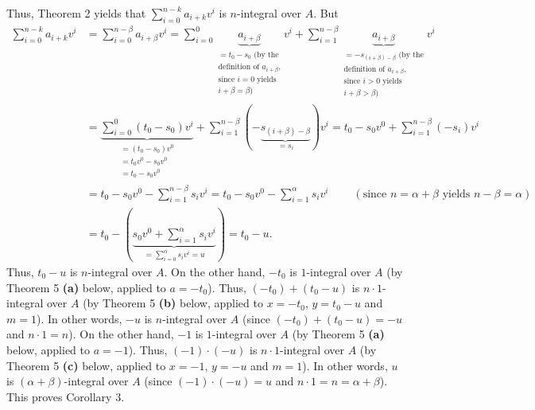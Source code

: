 \documentclass[12pt,final,notitlepage,onecolumn]{article}%
\begin{document}
Thus, Theorem 2 yields that $\sum\limits_{i=0}^{n-k}a_{i+k}v^{i}$ is
$n$-integral over $A$. But%
\begin{align*}
\sum\limits_{i=0}^{n-k}a_{i+k}v^{i}  &  =\sum\limits_{i=0}^{n-\beta}%
a_{i+\beta}v^{i}=\sum\limits_{i=0}^{0}\underbrace{a_{i+\beta}}%
_{\substack{=t_{0}-s_{0}\text{ (by the}\\\text{definition of }a_{i+\beta
}\text{,}\\\text{since }i=0\text{ yields}\\i+\beta=\beta\text{)}}}v^{i}%
+\sum\limits_{i=1}^{n-\beta}\underbrace{a_{i+\beta}}_{\substack{=-s_{\left(
i+\beta\right)  -\beta}\text{ (by the}\\\text{definition of }a_{i+\beta
}\text{,}\\\text{since }i>0\text{ yields}\\i+\beta>\beta\text{)}}}v^{i}\\
&  =\underbrace{\sum\limits_{i=0}^{0}\left(  t_{0}-s_{0}\right)  v^{i}%
}_{\substack{=\left(  t_{0}-s_{0}\right)  v^{0}\\=t_{0}v^{0}-s_{0}%
v^{0}\\=t_{0}-s_{0}v^{0}}}+\sum\limits_{i=1}^{n-\beta}\left(
-\underbrace{s_{\left(  i+\beta\right)  -\beta}}_{=s_{i}}\right)  v^{i}%
=t_{0}-s_{0}v^{0}+\sum\limits_{i=1}^{n-\beta}\left(  -s_{i}\right)  v^{i}\\
&  =t_{0}-s_{0}v^{0}-\sum\limits_{i=1}^{n-\beta}s_{i}v^{i}=t_{0}-s_{0}%
v^{0}-\sum\limits_{i=1}^{\alpha}s_{i}v^{i}\ \ \ \ \ \ \ \ \ \ \left(
\text{since }n=\alpha+\beta\text{ yields }n-\beta=\alpha\right) \\
&  =t_{0}-\left(  \underbrace{s_{0}v^{0}+\sum\limits_{i=1}^{\alpha}s_{i}v^{i}%
}_{=\sum\limits_{i=0}^{\alpha}s_{i}v^{i}=u}\right)  =t_{0}-u.
\end{align*}
Thus, $t_{0}-u$ is $n$-integral over $A$. On the other hand, $-t_{0}$ is
$1$-integral over $A$ (by Theorem 5 \textbf{(a)} below, applied to $a=-t_{0}%
$). Thus, $\left(  -t_{0}\right)  +\left(  t_{0}-u\right)  $ is $n\cdot
1$-integral over $A$ (by Theorem 5 \textbf{(b)} below, applied to $x=-t_{0}$,
$y=t_{0}-u$ and $m=1$). In other words, $-u$ is $n$-integral over $A$ (since
$\left(  -t_{0}\right)  +\left(  t_{0}-u\right)  =-u$ and $n\cdot1=n$). On the
other hand, $-1$ is $1$-integral over $A$ (by Theorem 5 \textbf{(a)} below,
applied to $a=-1$). Thus, $\left(  -1\right)  \cdot\left(  -u\right)  $ is
$n\cdot1$-integral over $A$ (by Theorem 5 \textbf{(c)} below, applied to
$x=-1$, $y=-u$ and $m=1$). In other words, $u$ is $\left(  \alpha
+\beta\right)  $-integral over $A$ (since $\left(  -1\right)  \cdot\left(
-u\right)  =u$ and $n\cdot1=n=\alpha+\beta$). This proves Corollary 3.
\end{document}
